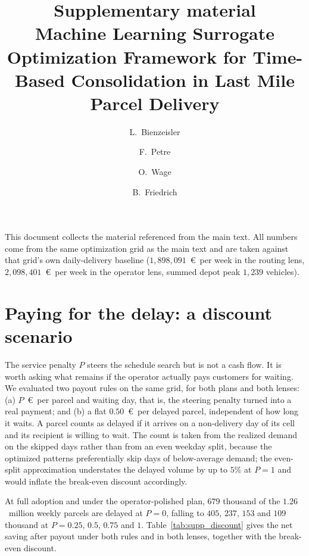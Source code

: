 \documentclass[11pt,a4paper]{article}
\title{Supplementary material\\[2mm]
\large Machine Learning Surrogate Optimization Framework for Time-Based
Consolidation in Last Mile Parcel Delivery}
\author{L.\ Bienzeisler \and F.\ Petre \and O.\ Wage \and B.\ Friedrich}
\date{}
\begin{document}
\maketitle

This document collects the material referenced from the main text. All numbers
come from the same optimization grid as the main text and are taken against
that grid's own daily-delivery baseline ($1{,}898{,}091$~\euro\ per week in the
routing lens, $2{,}098{,}401$~\euro\ per week in the operator lens, summed depot
peak $1{,}239$ vehicles).

\section{Paying for the delay: a discount scenario}
\label{sec:supp_discount}

The service penalty $P$ steers the schedule search but is not a cash flow. It
is worth asking what remains if the operator actually pays customers for
waiting. We evaluated two payout rules on the same grid, for both plans and
both lenses: (a) $P$~\euro\ per parcel and waiting day, that is, the steering
penalty turned into a real payment; and (b) a flat $0.50$~\euro\ per delayed
parcel, independent of how long it waits. A parcel counts as delayed if it
arrives on a non-delivery day of its cell and its recipient is willing to wait.
The count is taken from the realized demand on the skipped days rather than
from an even weekday split, because the optimized patterns preferentially skip
days of below-average demand; the even-split approximation understates the
delayed volume by up to $5\%$ at $P = 1$ and would inflate the break-even
discount accordingly.

At full adoption and under the operator-polished plan, $679$ thousand of the
$1.26$~million weekly parcels are delayed at $P = 0$, falling to $405$, $237$,
$153$ and $109$ thousand at $P = 0.25$, $0.5$, $0.75$ and $1$.
Table~\ref{tab:supp_discount} gives the net saving after payout under both
rules and in both lenses, together with the break-even discount.
\end{document}
